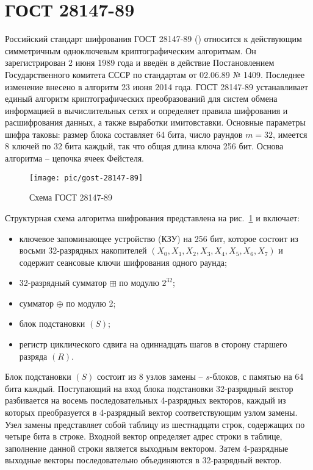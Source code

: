 \section{ГОСТ 28147-89}

Российский стандарт шифрования ГОСТ 28147-89 (\cite{GOST-89}) относится к действующим симметричным одноключевым криптографическим алгоритмам. Он зарегистрирован 2 июня 1989 года и введён в действие Постановлением Государственного комитета СССР по стандартам от 02.06.89 № 1409.
Последнее изменение внесено в алгоритм 23 июня 2014 года.
ГОСТ 28147-89 устанавливает единый алгоритм криптографических преобразований для систем обмена информацией в вычислительных сетях и определяет правила шифрования и расшифрования данных, а также выработки имитовставки. Основные параметры шифра таковы: размер блока составляет 64 бита, число раундов $m=32$, имеется 8 ключей по 32 бита каждый, так что общая длина ключа 256 бит. Основа алгоритма -- цепочка ячеек Фейстеля.

\begin{figure}[!ht]
    \centering
    \texttt{[image: pic/gost-28147-89]}
    \caption{Схема ГОСТ 28147-89\label{fig:gost-28147-89}}
\end{figure}

Структурная схема алгоритма шифрования представлена на рис.~\ref{fig:gost-28147-89} и включает:
\begin{itemize}
    \item ключевое запоминающее устройство (КЗУ) на 256 бит, которое состоит из восьми 32-разрядных накопителей $(X_0, X_1, X_2, X_3, X_4, X_5, X_6, X_7)$ и содержит сеансовые ключи шифрования одного раунда;
    \item 32-разрядный сумматор $\boxplus$ по модулю $2^{32}$;
    \item сумматор $\oplus$ по модулю 2;
    \item блок подстановки $(S)$;
    \item регистр циклического сдвига на одиннадцать шагов в сторону старшего разряда $(R)$.
\end{itemize}

Блок подстановки $(S)$ состоит из 8 узлов замены -- $s$-блоков, с памятью на 64 бита каждый. Поступающий на вход блока подстановки 32-разрядный вектор разбивается на восемь последовательных 4-разрядных векторов, каждый из которых преобразуется в 4-разрядный вектор соответствующим узлом замены. Узел замены представляет собой таблицу из шестнадцати строк, содержащих по четыре бита в строке. Входной вектор определяет адрес строки в таблице, заполнение данной строки является выходным вектором. Затем 4-разрядные выходные векторы последовательно объединяются в 32-разрядный вектор.

